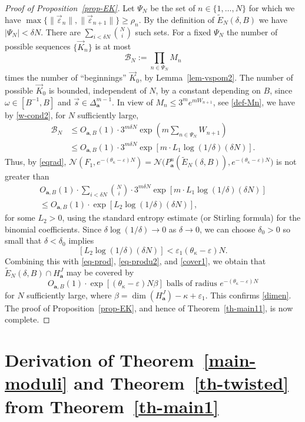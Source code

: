 \documentclass[10pt]{amsart}
\let\mathcal\mathscr
\let\epsilon\varepsilon
\theoremstyle{plain}
\theoremstyle{definition}
\let\wt\widetilde
\newcommand\bom{{\boldsymbol a}}\let\ba\bom
\let\eps\varepsilon
\let\om\omega
\newcommand\Ns{{\mathscr N}}
\newcommand\Bk{\mathcal{B}}
\begin{document}
\begin{proof}[Proof of Proposition~\ref{prop-EK}]
Let $\Psi_N$ be the set of $n\in \{1,\ldots,N\}$ for which
we have $\max\{\|\vec\eps_{n}\|,\|\vec\eps_{{n+1}}\|\}\ge \rho_n$.
By the definition of $\wt E_N(\delta,B)$ we have $|\Psi_N| <\delta N$.
There are $\sum_{i< \delta N} \binom{N}{ i}$ such sets. For a fixed $\Psi_N$ the number of possible sequences $\{\vec K_{n}\}$ is at most
\[
\Bk_N:= \prod_{n\in \Psi_N} M_n
\]
times the number of ``beginnings'' $\vec K_{0}$, by Lemma~\ref{lem-vspom2}.
The number of possible $\vec K_{0}$ is bounded, independent of $N$, by a constant depending on $B$, since $\om\in [B^{-1},B]$ and $\vec s\in \Delta_\bom^{m-1}$.
In view of $M_n \le 3^m e^{mW_{n+1}}$, see \eqref{def-Mn}, we have by \eqref{w-cond2}, for $N$ sufficiently large,
\begin{align*}
\Bk_N &\le O_{\bom,B}(1) \cdot 3^{m\delta N} \exp(m \textstyle\sum_{n\in \Psi_N}W_{n+1})\\
&\le O_{\bom,B}(1) \cdot 3^{m\delta N} \exp[m\cdot L_1\log(1/\delta)(\delta N)].
\end{align*}
Thus, by \eqref{eqrad},
$\Ns(F_1, e^{-(\theta_\kappa-\epsilon)N})\!=\!\Ns\bigl(P_\bom^u(\wt E_N(\delta,B)),e^{-(\theta_\kappa-\epsilon)N}\bigr)$ is not greater than
\begin{multline}
\label{lasta1}
O_{\bom,B}(1)\cdot \sum_{i<\delta N} \binom{N}{i} \cdot 3^{m\delta N} \exp[m\cdot L_1\log(1/\delta)(\delta N)]\\[-8pt]
\le O_{\bom,B}(1)\cdot \exp[L_2 \log(1/\delta)(\delta N)],
\end{multline}
for some $L_2>0$, using the standard entropy estimate (or Stirling formula) for the binomial coefficients. Since $\delta\log(1/\delta)\to 0$ as $\delta\to 0$, we can choose $\delta_0>0$ so small
that $\delta< \delta_0$ implies
\[
\left[L_2\log(1/\delta)(\delta N)\right] < \epsilon_1 (\theta_\kappa-\epsilon)N.
\]
Combining this with \eqref{eq-prod}, \eqref{eq-produ2}, and \eqref{cover1}, we obtain that $\wt E_N(\delta,B)\cap H_\bom^J$ may be covered by
\[
O_{\bom,B}(1)\cdot\exp\left[(\theta_\kappa-\eps)N\beta\right] \text{ balls of radius } e^{-(\theta_\kappa-\epsilon)N}
\]
for $N$ sufficiently large, where $\beta = \dim(H_\bom^J) - \kappa + \epsilon_1$. This confirms \eqref{dimen}.
The proof of Proposition~\ref{prop-EK}, and hence of
Theorem~\ref{th-main11}, is now complete.
\end{proof}

\section{Derivation of Theorem~\ref{main-moduli} and Theorem~\ref{th-twisted} from Theorem~\ref{th-main1} } \label{sec-deriv}
\end{document}
